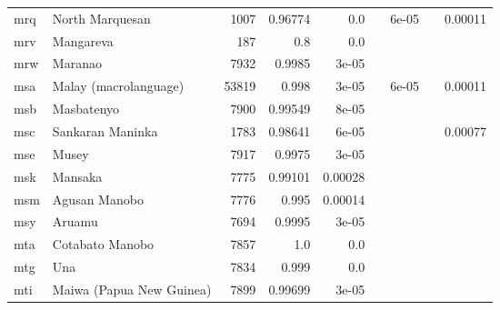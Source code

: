 \documentclass[11pt]{article}
\begin{document}
\begin{table*}[h]
{\begin{tabular}{llrrrrrrr}
mrq         & North Marquesan         & 1007         & 0.96774         & 0.0         &          & 6e-05         &          & 0.00011         \\

mrv         & Mangareva         & 187         & 0.8         & 0.0         &          &          &          &          \\

mrw         & Maranao         & 7932         & 0.9985         & 3e-05         &          &          &          &          \\

msa         & Malay (macrolanguage)         & 53819         & 0.998         & 3e-05         &          & 6e-05         &          & 0.00011         \\

msb         & Masbatenyo         & 7900         & 0.99549         & 8e-05         &          &          &          &          \\

msc         & Sankaran Maninka         & 1783         & 0.98641         & 6e-05         &          &          &          & 0.00077         \\

mse         & Musey         & 7917         & 0.9975         & 3e-05         &          &          &          &          \\

msk         & Mansaka         & 7775         & 0.99101         & 0.00028         &          &          &          &          \\

msm         & Agusan Manobo         & 7776         & 0.995         & 0.00014         &          &          &          &          \\

msy         & Aruamu         & 7694         & 0.9995         & 3e-05         &          &          &          &          \\

mta         & Cotabato Manobo         & 7857         & 1.0         & 0.0         &          &          &          &          \\

mtg         & Una         & 7834         & 0.999         & 0.0         &          &          &          &          \\

mti         & Maiwa (Papua New Guinea)         & 7899         & 0.99699         & 3e-05         &          &          &          &          \\


\end{tabular}}
\end{table*}
\end{document}
